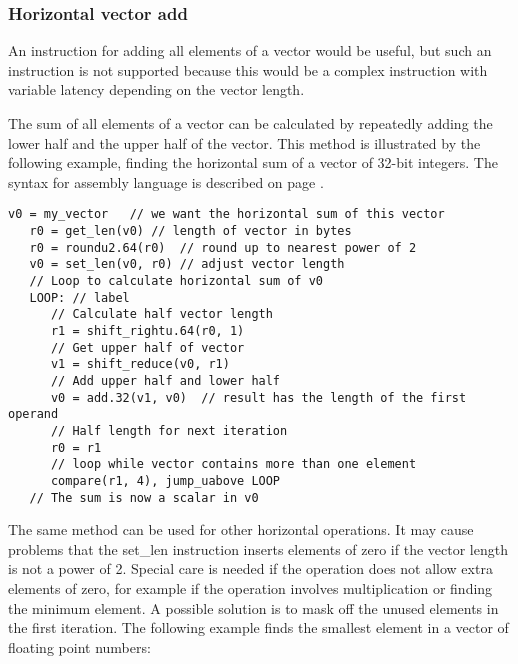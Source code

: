 \documentclass[forwardcom.tex]{subfiles}
\begin{document}
\subsubsection{Horizontal vector add} \label{horizontalVectorAdd}
An instruction for adding all elements of a vector would be useful, but such an instruction is not supported because this would be a complex instruction with variable latency depending on the vector length.
\vspace{2mm}

The sum of all elements of a vector can be calculated by repeatedly adding the lower half and the upper half of the vector. This method is illustrated by the following example, finding the horizontal sum of a vector of 32-bit integers. The syntax for assembly language is described on page \pageref{assemblySyntax}.

\begin{lstlisting}[frame=none]
   v0 = my_vector   // we want the horizontal sum of this vector
   r0 = get_len(v0) // length of vector in bytes
   r0 = roundu2.64(r0)  // round up to nearest power of 2
   v0 = set_len(v0, r0) // adjust vector length
   // Loop to calculate horizontal sum of v0
   LOOP: // label
      // Calculate half vector length
      r1 = shift_rightu.64(r0, 1)
      // Get upper half of vector
      v1 = shift_reduce(v0, r1)
      // Add upper half and lower half
      v0 = add.32(v1, v0)  // result has the length of the first operand
      // Half length for next iteration
      r0 = r1
      // loop while vector contains more than one element
      compare(r1, 4), jump_uabove LOOP      
   // The sum is now a scalar in v0
\end{lstlisting}

The same method can be used for other horizontal operations. It may cause problems that the set\_len instruction inserts elements of zero if the vector length is not a power of 2. Special care is needed if the operation does not allow extra elements of zero, for example if the operation involves multiplication or finding the minimum element. A possible solution is to mask off the unused elements in the first iteration. The following example finds the smallest element in a vector of floating point numbers:
\end{document}
